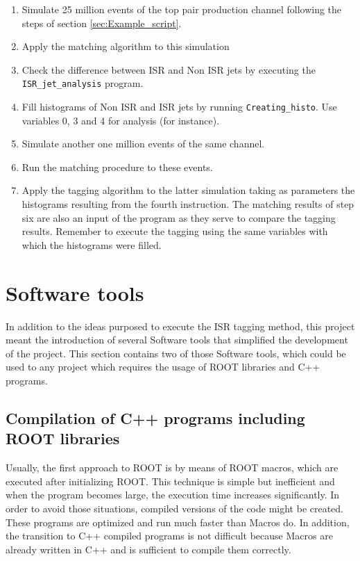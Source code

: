 \documentclass[12pt, oneside]{book}              %
\begin{document}
\begin{enumerate}
\item Simulate 25 million events of the top pair production channel
following the steps of section \ref{sec:Example_script}.
\item Apply the matching algorithm to this simulation
\item Check the difference between ISR and Non ISR jets by executing
the \texttt{ISR\_jet\_analysis} program.
\item Fill histograms of Non ISR and ISR jets by running \texttt{Creating\_histo}.
Use variables 0, 3 and 4 for analysis (for instance).
\item Simulate another one million events of the same channel.
\item Run the matching procedure to these events.
\item Apply the tagging algorithm to the latter simulation taking
as parameters the histograms resulting from the fourth instruction. The
matching results of step six are also an input of the program as they serve
to compare the tagging results. Remember to execute the tagging using
the same variables with which the histograms were filled.
\end{enumerate}

\chapter{Software tools} \label{cha:Software_tools}

In addition to the ideas purposed to execute the ISR tagging method,
this project meant the introduction of several Software tools that
simplified the development of the project. This section contains
two of those Software tools, which could be used to any project which
requires the usage of ROOT libraries and C++ programs.

\section[C++ and ROOT Makefile]{Compilation of C++ programs including ROOT libraries} \label{sec:Root_makefile}

Usually, the first approach to ROOT is by means of ROOT macros, which 
are executed after initializing ROOT. This technique is simple but
inefficient and when the program becomes large, the execution time
increases significantly. In order to avoid those situations, compiled
versions of the code might be created. These programs are optimized and
run much faster than Macros do. In addition, the transition to C++ 
compiled programs is not difficult because Macros are already written
in C++ and is sufficient to compile them correctly. 
\end{document}
